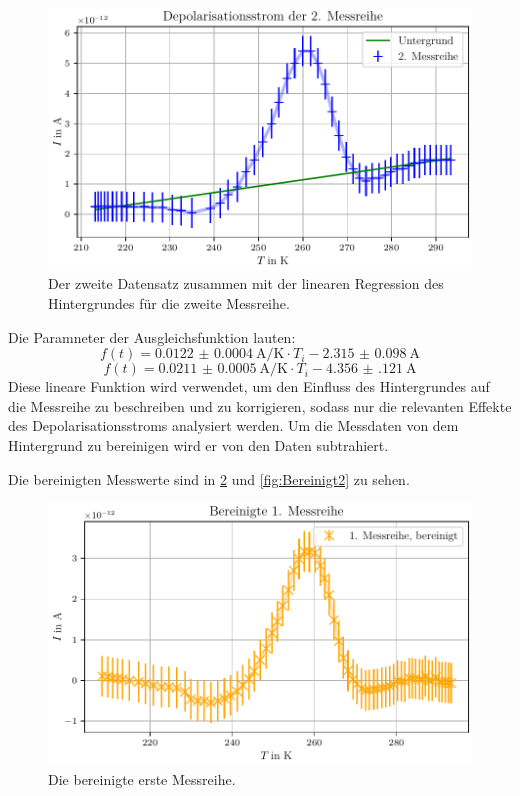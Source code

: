 \begin{figure}[H]
    \centering
    \includegraphics[width=\textwidth]{plots/C_messreihe2.pdf}
    \caption{Der zweite Datensatz zusammen mit der linearen Regression des Hintergrundes für die zweite Messreihe.}
    \label{fig:Hintergrund2}
\end{figure}

Die Paramneter der Ausgleichsfunktion lauten:
\begin{equation}
f(t) = \qty{0.0122(4)}{\ampere\per\kelvin} \cdot T_i - \qty{2.315(98)}{\ampere}
\end{equation}
\begin{equation}
f(t) = \qty{0.0211(5)}{\ampere\per\kelvin} \cdot T_i - \qty{4.356(121)}{\ampere}
\end{equation}
Diese lineare Funktion wird verwendet, um den Einfluss des Hintergrundes auf die Messreihe zu beschreiben und zu korrigieren,
sodass nur die relevanten Effekte des Depolarisationsstroms analysiert werden. Um die Messdaten von dem 
Hintergrund zu bereinigen wird er von den Daten subtrahiert.

Die bereinigten Messwerte sind in \ref{fig:Bereinigt1} und \ref{fig:Bereinigt2}  zu sehen.

\begin{figure}[H]
    \centering
    \includegraphics[width=\textwidth]{plots/D_messreihe1_bereinigt.pdf}
    \caption{Die bereinigte erste Messreihe.}
    \label{fig:Bereinigt1}
\end{figure}

